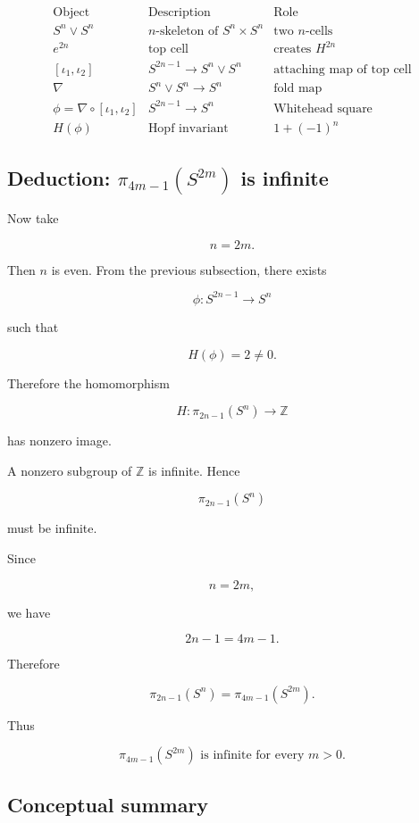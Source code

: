 \documentclass[12pt,a4paper]{article}
\theoremstyle{notespace}
\begin{document}
\[
\begin{array}{c|c|c}
	\text{Object} & \text{Description} & \text{Role}\\ \hline
	S^n\vee S^n & n\text{-skeleton of }S^n\times S^n & \text{two }n\text{-cells}\\
	e^{2n} & \text{top cell} & \text{creates }H^{2n}\\
	\left[\iota_1,\iota_2\right] & S^{2n-1}\to S^n\vee S^n & \text{attaching map of top cell}\\
	\nabla & S^n\vee S^n\to S^n & \text{fold map}\\
	\phi=\nabla\circ\left[\iota_1,\iota_2\right] & S^{2n-1}\to S^n & \text{Whitehead square}\\
	H(\phi) & \text{Hopf invariant} & 1+(-1)^n
\end{array}
\]

\subsection{Deduction: \(\pi_{4m-1}(S^{2m})\) is infinite}

Now take

\[
n=2m.
\]

Then \(n\) is even. From the previous subsection, there exists

\[
\phi:S^{2n-1}\to S^n
\]

such that

\[
H(\phi)=2\neq 0.
\]

Therefore the homomorphism

\[
H:\pi_{2n-1}(S^n)\to \mathbb Z
\]

has nonzero image.

A nonzero subgroup of \(\mathbb Z\) is infinite. Hence

\[
\pi_{2n-1}(S^n)
\]

must be infinite.

Since

\[
n=2m,
\]

we have

\[
2n-1=4m-1.
\]

Therefore

\[
\pi_{2n-1}(S^n)
=
\pi_{4m-1}(S^{2m}).
\]

Thus

\[
\boxed{
	\pi_{4m-1}(S^{2m})\text{ is infinite for every }m>0.
}
\]

\subsection{Conceptual summary}
\end{document}
